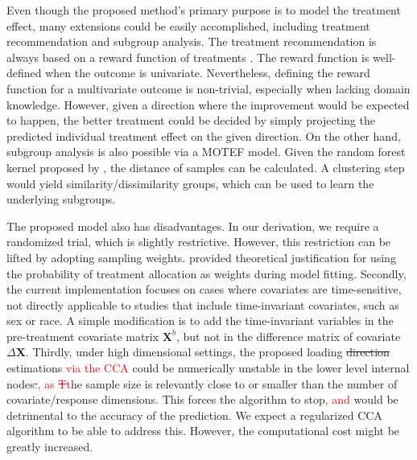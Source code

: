 \documentclass[smallextended]{svjour3}
\newcommand{\bg}[1]{\textcolor{red}{#1}}
\begin{document}
Even though the proposed method's primary purpose is to model the treatment effect, many extensions could be easily accomplished, including treatment recommendation and subgroup analysis. The treatment recommendation is always based on a reward function of treatments \citep{qian2011performance}. The reward function is well-defined when the outcome is univariate. Nevertheless, defining the reward function for a multivariate outcome is non-trivial, especially when lacking domain knowledge. However, given a direction where the improvement would be expected to happen, the better treatment could be decided by simply projecting the predicted individual treatment effect on the given direction. On the other hand, subgroup analysis is also possible via a MOTEF model. Given the random forest kernel proposed by \cite{davies2014random}, the distance of samples can be calculated. A clustering step would yield similarity/dissimilarity groups, which can be used to learn the underlying subgroups.

The proposed model also has disadvantages. In our derivation, we require a randomized trial, which is slightly restrictive. However, this restriction can be lifted by adopting sampling weights. \citep{tian2014simple} provided theoretical justification for using the probability of treatment allocation as weights during model fitting. Secondly, the current implementation focuses on cases where covariates are time-sensitive, not directly applicable to studies that include time-invariant covariates, such as sex or race. A simple modification is to add the time-invariant variables in the pre-treatment covariate matrix $\textbf{X}^b$, but not in the difference matrix of covariate $\Delta \textbf{X}$. Thirdly, under high dimensional settings, the proposed loading \st{direction} estimations \bg{via the CCA} could be numerically unstable in the lower level internal nodes\bg{\st{.}, as \st{T}t}he sample size is relevantly close to or smaller than the number of covariate/response dimensions. This forces the algorithm to stop\bg{, and} would be detrimental to the accuracy of the prediction. We expect a regularized CCA algorithm to be able to address this. However, the computational cost might be greatly increased. %
\end{document}
